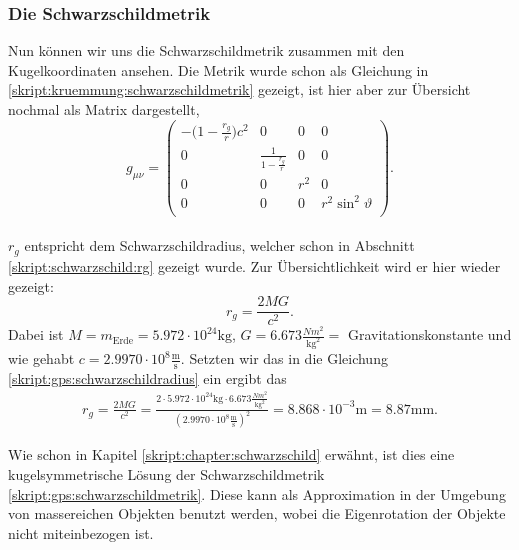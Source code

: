 \begin{refsection}
\subsubsection{Die Schwarzschildmetrik}
Nun können wir uns die Schwarzschildmetrik zusammen mit den Kugelkoordinaten ansehen. Die Metrik wurde schon als Gleichung in \eqref{skript:kruemmung:schwarzschildmetrik} gezeigt, ist hier aber zur Übersicht nochmal als Matrix dargestellt, 
\begin{equation}
g_{\mu\nu}= 
\begin{pmatrix}
-\biggl(1-\frac{r_g}r\biggr)c^2 & 0 & 0 & 0 \\
0 & \frac1{\displaystyle 1-\frac{r_g}r} & 0 & 0 \\
0 & 0 &  r^2 & 0 \\
0 & 0 & 0 & r^2 \sin^2\vartheta \\
\end{pmatrix}.
\label{skript:gps:schwarzschildmetrik}
\end{equation} \\
$r_g$ entspricht dem Schwarzschildradius, welcher schon in Abschnitt \ref{skript:schwarzschild:rg} gezeigt wurde. Zur Übersichtlichkeit wird er hier wieder gezeigt:
\begin{equation}
 r_g=\frac{2MG}{c^2}.
\label{skript:gps:schwarzschildradius}
\end{equation}
Dabei ist \( M = m_{\text{Erde}} = 5.972 \cdot 10^{24}\text{kg} \), \( G = 6.673 \frac{Nm^2}{\text{kg}^2} = \) Gravitationskonstante und wie gehabt \( c = 2.9970 \cdot 10^8 \frac{\text{m}}{\text{s}} \). Setzten wir das in die Gleichung \eqref{skript:gps:schwarzschildradius} ein ergibt das
\begin{align*}
r_g=\frac{2MG}{c^2} = \frac{2 \cdot 5.972 \cdot 10^{24}\text{kg} \cdot  6.673 \frac{Nm^2}{\text{kg}^2}}{ (2.9970 \cdot 10^8 \frac{\text{m}}{\text{s}})^2} = 8.868 \cdot 10^{-3}\text{m} = 8.87\text{mm.}
\end{align*}

Wie schon in Kapitel \ref{skript:chapter:schwarzschild} erwähnt, ist dies eine kugelsymmetrische Lösung der Schwarzschildmetrik \eqref{skript:gps:schwarzschildmetrik}. Diese kann als Approximation in der Umgebung von massereichen Objekten benutzt werden, wobei die Eigenrotation der Objekte nicht miteinbezogen ist.


\end{refsection}
